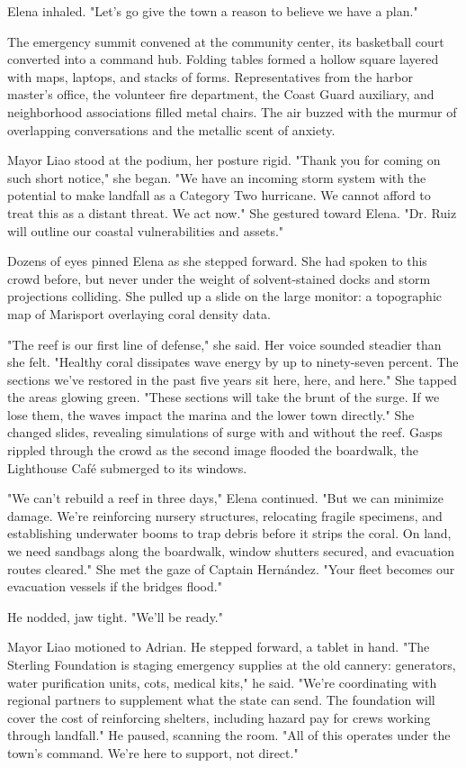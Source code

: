 Elena inhaled. "Let's go give the town a reason to believe we have a plan."

The emergency summit convened at the community center, its basketball court converted into a command hub. Folding tables formed a hollow square layered with maps, laptops, and stacks of forms. Representatives from the harbor master’s office, the volunteer fire department, the Coast Guard auxiliary, and neighborhood associations filled metal chairs. The air buzzed with the murmur of overlapping conversations and the metallic scent of anxiety.

Mayor Liao stood at the podium, her posture rigid. "Thank you for coming on such short notice," she began. "We have an incoming storm system with the potential to make landfall as a Category Two hurricane. We cannot afford to treat this as a distant threat. We act now." She gestured toward Elena. "Dr. Ruiz will outline our coastal vulnerabilities and assets."

Dozens of eyes pinned Elena as she stepped forward. She had spoken to this crowd before, but never under the weight of solvent-stained docks and storm projections colliding. She pulled up a slide on the large monitor: a topographic map of Marisport overlaying coral density data.

"The reef is our first line of defense," she said. Her voice sounded steadier than she felt. "Healthy coral dissipates wave energy by up to ninety-seven percent. The sections we've restored in the past five years sit here, here, and here." She tapped the areas glowing green. "These sections will take the brunt of the surge. If we lose them, the waves impact the marina and the lower town directly." She changed slides, revealing simulations of surge with and without the reef. Gasps rippled through the crowd as the second image flooded the boardwalk, the Lighthouse Café submerged to its windows.

"We can't rebuild a reef in three days," Elena continued. "But we can minimize damage. We're reinforcing nursery structures, relocating fragile specimens, and establishing underwater booms to trap debris before it strips the coral. On land, we need sandbags along the boardwalk, window shutters secured, and evacuation routes cleared." She met the gaze of Captain Hernández. "Your fleet becomes our evacuation vessels if the bridges flood."

He nodded, jaw tight. "We'll be ready."

Mayor Liao motioned to Adrian. He stepped forward, a tablet in hand. "The Sterling Foundation is staging emergency supplies at the old cannery: generators, water purification units, cots, medical kits," he said. "We're coordinating with regional partners to supplement what the state can send. The foundation will cover the cost of reinforcing shelters, including hazard pay for crews working through landfall." He paused, scanning the room. "All of this operates under the town's command. We're here to support, not direct."

